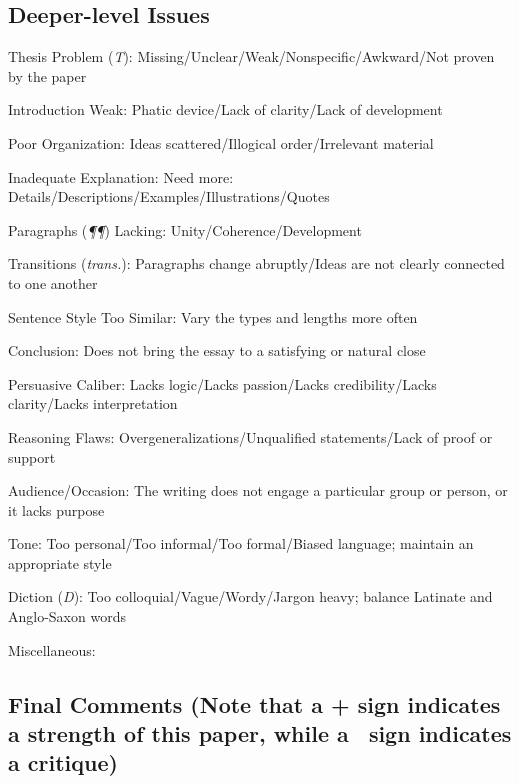 \documentclass[11pt,twocolumn]{article}
\begin{document}
\subsection*{Deeper-level Issues}

\begin{issues}

\item Thesis Problem (\emph{T}): Missing/Unclear/Weak/Nonspecific/Awkward/Not proven by the paper
\item Introduction Weak: Phatic device/Lack of clarity/Lack of development
\item Poor Organization: Ideas scattered/Illogical order/Irrelevant material
\item Inadequate Explanation: Need more: Details/Descriptions/Examples/Illustrations/Quotes
\item Paragraphs (\emph{\P\P}) Lacking: Unity/Coherence/Development
\item Transitions (\emph{trans.}): Paragraphs change abruptly/Ideas are not clearly connected to one another
\item Sentence Style Too Similar: Vary the types and lengths more often
\item Conclusion: Does not bring the essay to a satisfying or natural close
\item Persuasive Caliber: Lacks logic/Lacks passion/Lacks credibility/Lacks clarity/Lacks interpretation
\item Reasoning Flaws: Overgeneralizations/Unqualified statements/Lack of proof or support
\item Audience/Occasion: The writing does not engage a particular group or person, or it lacks purpose
\item Tone: Too personal/Too informal/Too formal/Biased language; maintain an appropriate style
\item Diction (\emph{D}): Too colloquial/Vague/Wordy/Jargon heavy; balance Latinate and Anglo-Saxon words
\item Miscellaneous:

\end{issues}

\subsection*{Final Comments (Note that a + sign indicates a strength of this paper, while a \textminus\ sign indicates a critique)}


\end{document}
